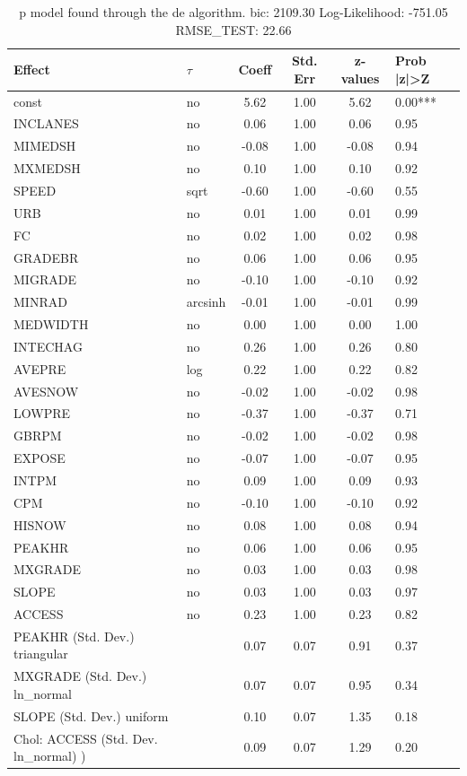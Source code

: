 \begin{table}
	\caption{p model found through the de algorithm. bic: 2109.30 Log-Likelihood: -751.05 RMSE_TEST: 22.66}
	\begin{center}
		\begin{tabular}{|l|l|c|c|c|l|}
			\hline
			Effect & $\tau$ & Coeff & Std. Err & z-values & Prob |z|>Z \\
			\hline
			const & no & 5.62 & 1.00 & 5.62 & 0.00*** \\
			\hline
			INCLANES & no & 0.06 & 1.00 & 0.06 & 0.95 \\
			\hline
			MIMEDSH & no & -0.08 & 1.00 & -0.08 & 0.94 \\
			\hline
			MXMEDSH & no & 0.10 & 1.00 & 0.10 & 0.92 \\
			\hline
			SPEED & sqrt & -0.60 & 1.00 & -0.60 & 0.55 \\
			\hline
			URB & no & 0.01 & 1.00 & 0.01 & 0.99 \\
			\hline
			FC & no & 0.02 & 1.00 & 0.02 & 0.98 \\
			\hline
			GRADEBR & no & 0.06 & 1.00 & 0.06 & 0.95 \\
			\hline
			MIGRADE & no & -0.10 & 1.00 & -0.10 & 0.92 \\
			\hline
			MINRAD & arcsinh & -0.01 & 1.00 & -0.01 & 0.99 \\
			\hline
			MEDWIDTH & no & 0.00 & 1.00 & 0.00 & 1.00 \\
			\hline
			INTECHAG & no & 0.26 & 1.00 & 0.26 & 0.80 \\
			\hline
			AVEPRE & log & 0.22 & 1.00 & 0.22 & 0.82 \\
			\hline
			AVESNOW & no & -0.02 & 1.00 & -0.02 & 0.98 \\
			\hline
			LOWPRE & no & -0.37 & 1.00 & -0.37 & 0.71 \\
			\hline
			GBRPM & no & -0.02 & 1.00 & -0.02 & 0.98 \\
			\hline
			EXPOSE & no & -0.07 & 1.00 & -0.07 & 0.95 \\
			\hline
			INTPM & no & 0.09 & 1.00 & 0.09 & 0.93 \\
			\hline
			CPM & no & -0.10 & 1.00 & -0.10 & 0.92 \\
			\hline
			HISNOW & no & 0.08 & 1.00 & 0.08 & 0.94 \\
			\hline
			PEAKHR & no & 0.06 & 1.00 & 0.06 & 0.95 \\
			\hline
			MXGRADE & no & 0.03 & 1.00 & 0.03 & 0.98 \\
			\hline
			SLOPE & no & 0.03 & 1.00 & 0.03 & 0.97 \\
			\hline
			ACCESS & no & 0.23 & 1.00 & 0.23 & 0.82 \\
			\hline
			PEAKHR (Std. Dev.) triangular &  & 0.07 & 0.07 & 0.91 & 0.37 \\
			\hline
			MXGRADE (Std. Dev.) ln_normal &  & 0.07 & 0.07 & 0.95 & 0.34 \\
			\hline
			SLOPE (Std. Dev.) uniform &  & 0.10 & 0.07 & 1.35 & 0.18 \\
			\hline
			 Chol: ACCESS (Std. Dev. ln_normal) ) &  & 0.09 & 0.07 & 1.29 & 0.20 \\
			\hline
		\end{tabular}
	\end{center}
\end{table}
